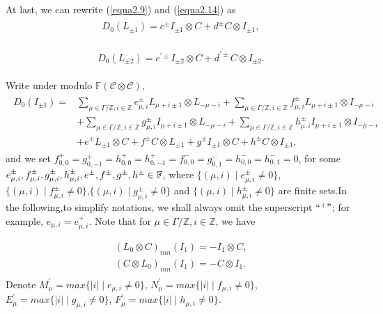 \documentclass{amsart}
\theoremstyle{definition}
\theoremstyle{remark}
\numberwithin{equation}{subsection}
\numberwithin{equation}{section}
\begin{document}
At last, we can rewrite (\ref{equa2.9}) and (\ref{equa2.14}) as
\begin{eqnarray}\label{equa2.25}
\begin{split}
D_0(L_{\pm 1})= c^{\pm}I_{\pm1}\otimes C +d^{\pm}C \otimes I_{\pm1}
,
\end{split}
\end{eqnarray}

\begin{eqnarray}\label{equa2.26}
 \begin{split}
 D_0(L_{\pm 2})=
 c^{'\pm}I_{\pm2}\otimes C  +d^{'\pm}C \otimes
 I_{\pm2}.
 \end{split}
\end{eqnarray}

Write under modulo $\mathbb{F}(\mathcal {C} \otimes \mathcal {C})$,
\begin{eqnarray}\label{equa2.27}
\begin{split}
D_0(I_{\pm 1})=&\underset{\mu\in \Gamma/\mathbb{Z},i\in
\mathbb{Z}}{\sum}{e^{\pm}_{\mu,i} L_{\mu+i\pm 1} \otimes
L_{-\mu-i}}+  \underset{\mu\in \Gamma/\mathbb{Z},i\in
\mathbb{Z}}{\sum}{f^{\pm}_{\mu,i}
L_{\mu+i\pm 1} \otimes I_{-\mu-i}}\\
&+\underset{\mu\in \Gamma/\mathbb{Z},i\in
\mathbb{Z}}{\sum}{g^{\pm}_{\mu,i} I_{\mu+i\pm 1} \otimes
L_{-\mu-i}}+  \underset{\mu\in \Gamma/\mathbb{Z},i\in
\mathbb{Z}}{\sum}{h^{\pm}_{\mu,i} I_{\mu+i\pm 1} \otimes
I_{-\mu-i}}\\ &+ e^{\pm}L_{\pm1}\otimes C+f^{\pm}C \otimes L_{\pm1}
+g^{\pm}I_{\pm1}\otimes C +h^{\pm}C \otimes I_{\pm1} ,
\end{split}
\end{eqnarray}
and we set $f^{+}_{0,0}=g^{+}_{0,-1}=h^{+}_{0,0}=
 h^{+}_{0,-1}=f^{-}_{0,0}=g^{-}_{0,1}=
 h^{-}_{0,0}=h^{-}_{0,1}=0$, for some
 $e^{\pm}_{\mu,i},f^{\pm}_{\mu,i},g^{\pm}_{\mu,i},h^{\pm}_{\mu,i},
 \\
  e^{\pm},f^{\pm},g^{\pm},h^{\pm}\in
  \mathbb{F}$, where $\{(\mu,i)\mid e^{\pm}_{\mu,i}\neq 0 \}$,  $\{(\mu,i)\mid f^{\pm}_{\mu,i}\neq 0
  \}$,$\{(\mu,i)\mid g^{\pm}_{\mu,i}\neq 0 \}$ and $\{(\mu,i)\mid h^{\pm}_{\mu,i}\neq 0 \}$
  are finite sets.In the following,to simplify notations, we shall
  always omit the superscript $``^+"$; for example,
  $e_{\mu,i}=e^{+}_{\mu,i}$. Note that for $\mu \in \Gamma/\mathbb{Z},i\in
  \mathbb{Z}$, we have

 $$\begin{array}{l}
(L_0 \otimes C)_{inn}(I_1)=-I_1\otimes C,  \\[12pt]
(C \otimes L_0)_{inn}(I_1)=-C\otimes I_1.  \\[12pt]
 \end{array}$$
Denote
      $M^{'}_\mu=max\{|i|\mid e_{\mu,i}\neq 0 \}$,  $N^{'}_\mu=max\{|i|\mid f_{\mu,i}\neq 0\}$,
      $E^{'}_\mu=max\{|i|\mid g_{\mu,i}\neq 0 \}$,  $F^{'}_\mu=max\{|i|\mid h_{\mu,i}\neq 0\}$.
\end{document}
